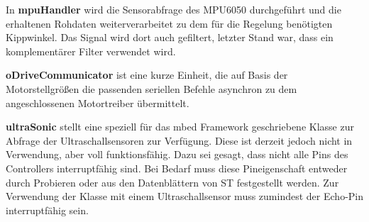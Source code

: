 \par\bigskip
In \textbf{mpuHandler} wird die Sensorabfrage des MPU6050 durchgeführt und die erhaltenen Rohdaten weiterverarbeitet zu dem für die Regelung benötigten Kippwinkel. Das Signal wird dort auch gefiltert, letzter Stand war, dass ein komplementärer Filter verwendet wird.

\par\bigskip
\textbf{oDriveCommunicator} ist eine kurze Einheit, die auf Basis der Motorstellgrößen die passenden seriellen Befehle asynchron zu dem angeschlossenen Motortreiber übermittelt.

\par\bigskip
\textbf{ultraSonic} stellt eine speziell für das mbed Framework geschriebene Klasse zur Abfrage der Ultraschallsensoren zur Verfügung. Diese ist derzeit jedoch nicht in Verwendung, aber voll funktionsfähig. Dazu sei gesagt, dass nicht alle Pins des Controllers interruptfähig sind. Bei Bedarf muss diese Pineigenschaft entweder durch Probieren oder aus den Datenblättern von ST festgestellt werden. Zur Verwendung der Klasse mit einem Ultraschallsensor muss zumindest der Echo-Pin interruptfähig sein.

\newpage
